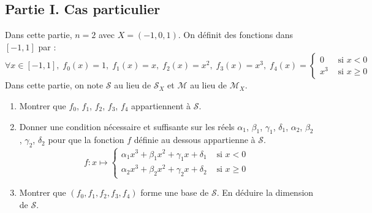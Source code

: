 \subsection*{Partie I. Cas particulier}
Dans cette partie, $n=2$ avec $X = (-1, 0, 1)$. On définit des fonctions dans $[-1,1]$ par :
\begin{displaymath}
\forall x\in [-1,1],\; f_0(x) = 1, \; f_1(x) = x, \; f_2(x) = x^2, \; f_3(x) = x^3
, \; f_4(x) =
\left\lbrace 
\begin{aligned}
  0 &\text{ si } x < 0 \\ x^3 &\text{ si } x \geq 0
\end{aligned}
\right. 
\end{displaymath}
Dans cette partie, on note $\mathcal{S}$ au lieu de $\mathcal{S}_X$ et $\mathcal{M}$ au lieu de $\mathcal{M}_X$.
\begin{enumerate}
\item Montrer que $f_0$, $f_1$, $f_2$, $f_3$, $f_4$ appartiennent à $\mathcal{S}$. 
\item Donner une condition nécessaire et suffisante sur les réels $\alpha_1$, $\beta_1$, $\gamma_1$, $\delta_1$, $\alpha_2$, $\beta_2$, $\gamma_2$, $\delta_2$ pour que la fonction $f$ définie au dessous appartienne à $\mathcal{S}$.
\begin{displaymath}
f : x \mapsto \left\{ \begin{array}{ll} \alpha_1 x^3 + \beta_1 x^2 + \gamma_1 x + \delta_1 & \text{ si } x < 0 \\ \alpha_2 x^3 + \beta_2 x^2 + \gamma_2 x + \delta_2 & \text{ si } x \geqslant 0  \end{array} \right.  
\end{displaymath}

\item Montrer que $(f_0,f_1,f_2,f_3,f_4)$ forme une base de $\mathcal{S}$. En déduire la dimension de $\mathcal{S}$.
\end{enumerate}

